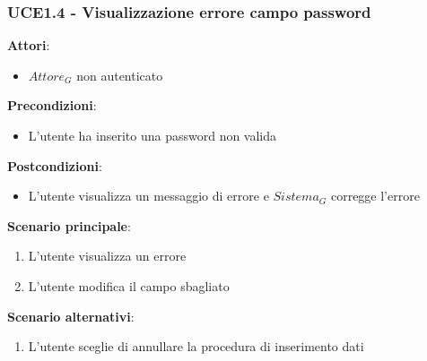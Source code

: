 \subsubsection{UCE1.4 - Visualizzazione errore campo password}
\textbf{Attori}:
\begin{itemize}
    \item $\textit{Attore}_G$ non autenticato
\end{itemize}
\textbf{Precondizioni}:
\begin{itemize}
    \item L'utente ha inserito una password non valida
\end{itemize}
\textbf{Postcondizioni}:
\begin{itemize}
    \item L'utente visualizza un messaggio di errore e $\textit{Sistema}_G$ corregge l'errore
\end{itemize}
\textbf{Scenario principale}:
\begin{enumerate}
    \item L'utente visualizza un errore 
    \item L'utente modifica il campo sbagliato
\end{enumerate}
\textbf{Scenario alternativi}:
\begin{enumerate}
    \item L'utente sceglie di annullare la procedura di inserimento dati
\end{enumerate}